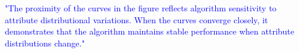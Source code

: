 \documentclass[sigconf, nonacm]{acmart}
\begin{document}
\textcolor{blue}{"The proximity of the curves in the figure reflects algorithm sensitivity to attribute distributional variations. When the curves converge closely, it demonstrates that the algorithm maintains stable performance when attribute distributions change."}
%
%
%
%
%
%
\end{document}
